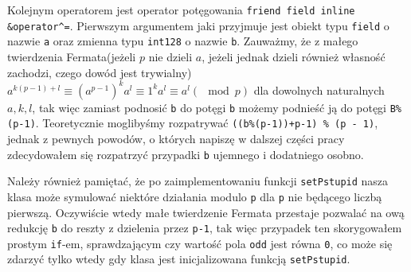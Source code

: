 \documentclass{article}
\begin{document}
Kolejnym operatorem jest operator potęgowania \texttt{friend field inline \&operator}\verb!^!\texttt{=}. 
Pierwszym argumentem jaki przyjmuje jest obiekt typu \texttt{field} o nazwie \texttt{a} oraz zmienna typu 
\texttt{\textunderscore \textunderscore int128} o
nazwie \texttt{b}. Zauważmy, że z małego twierdzenia Fermata(jeżeli $p$ nie dzieli $a$, jeżeli jednak dzieli również własność zachodzi, 
czego dowód jest trywialny) $a^{k(p-1)+l} \equiv (a^{p-1})^ka^l \equiv 1^ka^l \equiv a^l (\mod p) $ dla dowolnych naturalnych
$a,k,l$, tak więc
zamiast podnosić \texttt{b} do potęgi \texttt{b} możemy podnieść ją do potęgi \texttt{B\%(p-1)}.
Teoretycznie moglibyśmy rozpatrywać \texttt{((b\%(p-1))+p-1) \% (p - 1)}, jednak z pewnych powodów, o 
których napiszę w dalszej części pracy zdecydowałem się rozpatrzyć przypadki \texttt{b} ujemnego i 
dodatniego osobno. 

Należy również pamiętać, że po zaimplementowaniu funkcji \texttt{setPstupid}
nasza klasa może symulować niektóre działania modulo \texttt{p} dla \texttt{p}
nie będącego liczbą pierwszą. Oczywiście wtedy małe twierdzenie Fermata
przestaje pozwalać na ową redukcję \texttt{b} do reszty z dzielenia przez
\texttt{p-1}, tak więc przypadek ten skorygowałem prostym \texttt{if}-em, sprawdzającym 
czy wartość pola \texttt{odd} jest równa \texttt{0}, co może się zdarzyć tylko wtedy gdy klasa 
jest inicjalizowana funkcją \texttt{setPstupid}.
\end{document}
